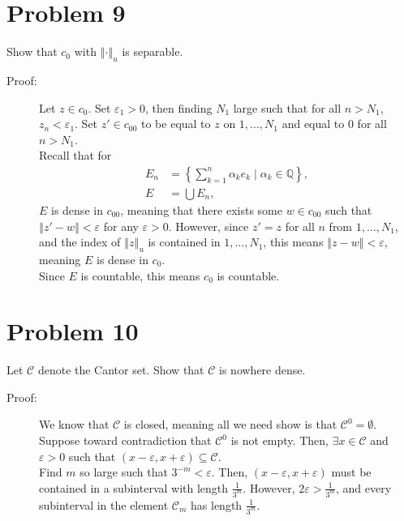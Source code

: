 \documentclass[8pt]{extarticle}
\newcommand{\Q}{\mathbb{Q}}
\newcommand{\norm}[1]{\left\Vert #1\right\Vert}
\begin{document}
  \section{Problem 9}%
  Show that $c_0$ with $\norm{\cdot}_u$ is separable.
  \begin{description}
    \item[Proof:] Let $z\in c_0$. Set $\varepsilon_1 > 0$, then finding $N_1$ large such that for all $n > N_1$, $z_n < \varepsilon_1$. Set $z'\in c_{00}$ to be equal to $z$ on $1,\dots,N_1$ and equal to $0$ for all $n > N_1$.\\

      Recall that for
      \begin{align*}
        E_n &= \left\{\sum_{k=1}^{n}\alpha_ke_k\mid \alpha_k\in \Q\right\},\\
        E &= \bigcup E_n,
      \end{align*}
      $E$ is dense in $c_{00}$, meaning that there exists some  $w\in c_{00}$ such that $\norm{z'-w} < \varepsilon$ for any $\varepsilon > 0$. However, since $z' = z$ for all $n$ from $1,\dots,N_1$, and the index of $\norm{z}_{u}$ is contained in $1,\dots,N_1$, this means $\norm{z-w} < \varepsilon$, meaning $E$ is dense in $c_{0}$.\\

      Since $E$ is countable, this means $c_0$ is countable.
  \end{description}
  \section{Problem 10}%
  Let $\mathcal{C}$ denote the Cantor set. Show that $\mathcal{C}$ is nowhere dense.
  \begin{description}
    \item[Proof:] We know that $\mathcal{C}$ is closed, meaning all we need show is that $\mathcal{C}^{0} = \emptyset$.\\

      Suppose toward contradiction that $\mathcal{C}^{0}$ is not empty. Then, $\exists x\in \mathcal{C}$ and $\varepsilon > 0$ such that $(x-\varepsilon, x+\varepsilon) \subseteq \mathcal{C}$.\\

      Find $m$ so large such that $3^{-m} < \varepsilon$. Then, $(x-\varepsilon, x + \varepsilon)$ must be contained in a subinterval with length $\frac{1}{3^m}$. However, $2\varepsilon > \frac{1}{3^m}$, and every subinterval in the element $\mathcal{C}_m$ has length $\frac{1}{3^m}$.
  \end{description}
\end{document}
